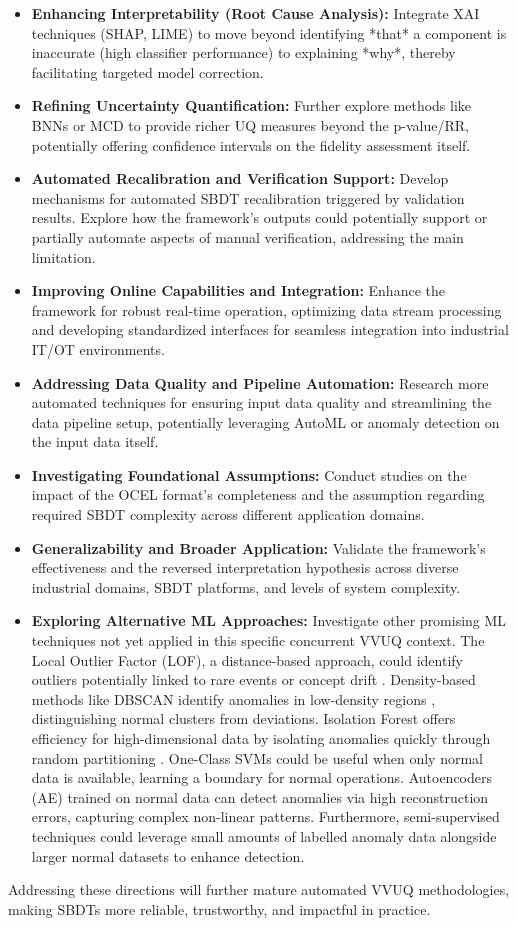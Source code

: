 \begin{itemize}
  \item \textbf{Enhancing Interpretability (Root Cause Analysis):} Integrate XAI techniques (SHAP, LIME) to move beyond identifying *that* a component is inaccurate (high classifier performance) to explaining *why*, thereby facilitating targeted model correction.
  \item \textbf{Refining Uncertainty Quantification:} Further explore methods like BNNs or MCD to provide richer UQ measures beyond the p-value/RR, potentially offering confidence intervals on the fidelity assessment itself.
  \item \textbf{Automated Recalibration and Verification Support:} Develop mechanisms for automated SBDT recalibration triggered by validation results. Explore how the framework's outputs could potentially support or partially automate aspects of manual verification, addressing the main limitation.
  \item \textbf{Improving Online Capabilities and Integration:} Enhance the framework for robust real-time operation, optimizing data stream processing and developing standardized interfaces for seamless integration into industrial IT/OT environments.
  \item \textbf{Addressing Data Quality and Pipeline Automation:} Research more automated techniques for ensuring input data quality and streamlining the data pipeline setup, potentially leveraging AutoML or anomaly detection on the input data itself.
  \item \textbf{Investigating Foundational Assumptions:} Conduct studies on the impact of the OCEL format's completeness and the assumption regarding required SBDT complexity across different application domains.
  \item \textbf{Generalizability and Broader Application:} Validate the framework's effectiveness and the reversed interpretation hypothesis across diverse industrial domains, SBDT platforms, and levels of system complexity.
  \item \textbf{Exploring Alternative ML Approaches:} Investigate other promising ML techniques not yet applied in this specific concurrent VVUQ context. The Local Outlier Factor (LOF), a distance-based approach, could identify outliers potentially linked to rare events or concept drift \autocite{alghushairy2020review}. Density-based methods like DBSCAN identify anomalies in low-density regions \autocite{ccelik2011anomaly}, distinguishing normal clusters from deviations. Isolation Forest offers efficiency for high-dimensional data by isolating anomalies quickly through random partitioning \autocite{xu2017improved}. One-Class SVMs \autocite{li2003improving} could be useful when only normal data is available, learning a boundary for normal operations. Autoencoders (AE) \autocite{zhou2017anomaly} trained on normal data can detect anomalies via high reconstruction errors, capturing complex non-linear patterns. Furthermore, semi-supervised techniques could leverage small amounts of labelled anomaly data alongside larger normal datasets to enhance detection.
\end{itemize}

Addressing these directions will further mature automated VVUQ methodologies, making SBDTs more reliable, trustworthy, and impactful in practice.